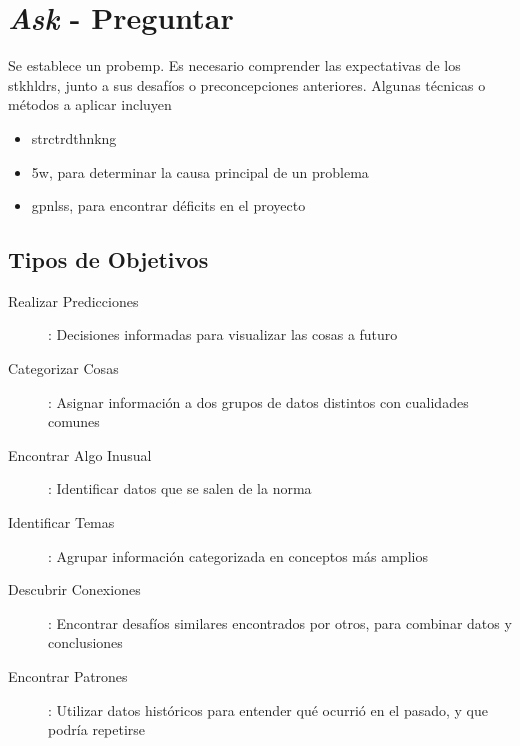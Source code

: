 \section{\textit{Ask} - Preguntar}
Se establece un \gls{probemp}. Es necesario comprender las expectativas de los \gls{stkhldrs}, junto a sus desafíos o preconcepciones anteriores. Algunas técnicas o métodos a aplicar incluyen
\begin{itemize}
    \item {\gls{strctrdthnkng}}
    \item {\gls{5w}, para determinar la causa principal de un problema}
    \item {\gls{gpnlss}, para encontrar déficits en el proyecto}
\end{itemize}

\subsection{Tipos de Objetivos}
\begin{description}
    \item [Realizar Predicciones]{ : Decisiones informadas para visualizar las cosas a futuro}
    \item [Categorizar Cosas]{ : Asignar información a dos grupos de datos distintos con cualidades comunes}
    \item [Encontrar Algo Inusual]{ : Identificar datos que se salen de la norma}
    \item [Identificar Temas]{ : Agrupar información categorizada en conceptos más amplios}
    \item [Descubrir Conexiones]{ : Encontrar desafíos similares encontrados por otros, para combinar datos y conclusiones}
    \item [Encontrar Patrones]{ : Utilizar datos históricos para entender qué ocurrió en el pasado, y que podría repetirse}
\end{description}


